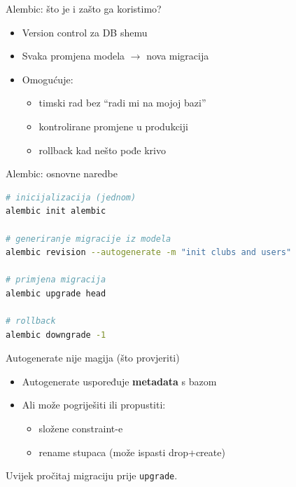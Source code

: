	\begin{frame}{Alembic: što je i zašto ga koristimo?}
		\begin{itemize}
			\item Version control za DB shemu
			\item Svaka promjena modela $\rightarrow$ nova migracija
			\item Omogućuje:
			\begin{itemize}
				\item timski rad bez \enquote{radi mi na mojoj bazi}
				\item kontrolirane promjene u produkciji
				\item rollback kad nešto pođe krivo
			\end{itemize}
		\end{itemize}
	\end{frame}
	
	\begin{frame}[fragile,shrink=5]{Alembic: osnovne naredbe}
\begin{lstlisting}[language=bash]
# inicijalizacija (jednom)
alembic init alembic

# generiranje migracije iz modela
alembic revision --autogenerate -m "init clubs and users"

# primjena migracija
alembic upgrade head

# rollback
alembic downgrade -1
\end{lstlisting}
	\end{frame}
	
	\begin{frame}{Autogenerate nije magija (što provjeriti)}
		\begin{itemize}
			\item Autogenerate uspoređuje \textbf{metadata} s bazom
			\item Ali može pogriješiti ili propustiti:
			\begin{itemize}
				\item složene constraint-e
				\item rename stupaca (može ispasti drop+create)
			\end{itemize}
		\end{itemize}
		
		\vspace{0.6em}
		Uvijek pročitaj migraciju prije \texttt{upgrade}.
	\end{frame}
	
